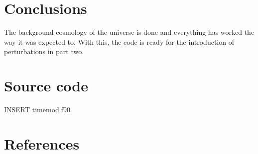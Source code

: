 \documentclass{aa}   %
\begin{document}
\section{Conclusions} \label{sec:conclusions}
The background cosmology of the universe is done and everything has worked the way it was expected to.
With this, the code is ready for the introduction of perturbations in part two.
\section{Source code}\label{sec:files}
INSERT timemod.f90

\section{References}

\end{document}

